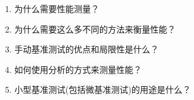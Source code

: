 \begin{enumerate}
\item 为什么需要性能测量？
\item 为什么需要这么多不同的方法来衡量性能？
\item 手动基准测试的优点和局限性是什么？
\item 如何使用分析的方式来测量性能？
\item 小型基准测试(包括微基准测试)的用途是什么？
\end{enumerate}